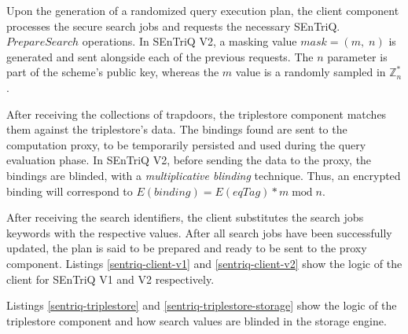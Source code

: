 %

%

Upon the generation of a randomized query execution plan, the client component processes the secure search jobs and requests the necessary SEnTriQ.$PrepareSearch$ operations. In \gls{SEnTriQ} V2, a masking value $mask = (m, \; n)$ is generated and sent alongside each of the previous requests. 
The $n$ parameter is part of the scheme's public key, whereas the $m$ value is a randomly sampled in $\mathbb{Z}^*_n$.

After receiving the collections of trapdoors, the triplestore component matches them against the triplestore's data. The bindings found are sent to the computation proxy, to be temporarily persisted and used during the query evaluation phase. In \gls{SEnTriQ} V2, before sending the data to the proxy, the bindings are blinded, with a \emph{multiplicative blinding} technique. Thus, an encrypted binding will correspond to $E(binding) = E(eqTag) * m \; \textrm{mod} \; n$.

After receiving the search identifiers, the client substitutes the search jobs keywords with the respective values. After all search jobs have been successfully updated, the plan is said to be prepared and ready to be sent to the proxy component. Listings \ref{sentriq-client-v1} and \ref{sentriq-client-v2} show the logic of the client for \gls{SEnTriQ} V1 and V2 respectively.

%

%

Listings \ref{sentriq-triplestore} and \ref{sentriq-triplestore-storage} show the logic of the triplestore component and how search values are blinded in the storage engine.

%

%

